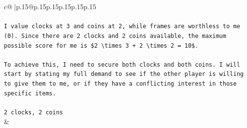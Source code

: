 \documentclass{article}
\begin{document}
{\begin{supertabular}{c@{$\;$}|p{.15\linewidth}@{}p{.15\linewidth}p{.15\linewidth}p{.15\linewidth}p{.15\linewidth}p{.15\linewidth}}
{{{\\ 
\\ 
\texttt{I value clocks at 3 and coins at 2, while frames are worthless to me (0). Since there are 2 clocks and 2 coins available, the maximum possible score for me is \$2 \textbackslash{}times 3 + 2 \textbackslash{}times 2 = 10\$.} \\
\\ 
\texttt{To achieve this, I need to secure both clocks and both coins. I will start by stating my full demand to see if the other player is willing to give them to me, or if they have a conflicting interest in those specific items.} \\
\\ 
\texttt{2 clocks, 2 coins} \\
            }
        }
    }
    & \\ \\


\end{supertabular}}
\end{document}
